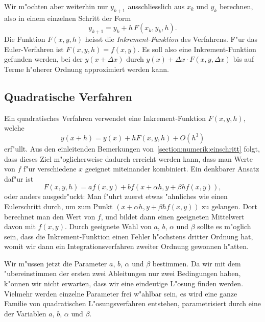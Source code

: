 Wir m"ochten aber weiterhin nur $y_{k+1}$ ausschliesslich aus $x_k$ und $y_k$
berechnen, also in einem einzelnen Schritt der Form
\[
y_{k+1}=y_k + h\, F(x_k, y_k, h).
\]
Die Funktion $F(x,y,h)$ heisst die {\em Inkrement-Funktion}
des Verfahrens.
F"ur das Euler-Verfahren ist $F(x,y,h)=f(x,y)$.
Es soll also eine Inkrement-Funktion gefunden werden, bei der $y(x+\Delta x)$
durch $y(x) + \Delta x\cdot F(x,y,\Delta x)$ bis auf Terme h"oherer
Ordnung approximiert werden kann.

\subsection{Quadratische Verfahren}
Ein quadratisches Verfahren verwendet eine Inkrement-Funktion $F(x,y,h)$,
welche
\[
y(x+h)=y(x)+hF(x,y,h)+O(h^3)
\]
erf"ullt.
Aus den einleitenden Bemerkungen von~\ref{section:numerik:einschritt}
folgt, dass dieses Ziel m"oglicherweise dadurch erreicht werden kann,
dass man Werte von $f$ f"ur verschiedene $x$ geeignet miteinander
kombiniert.
Ein denkbarer Ansatz daf"ur ist
\[
F(x,y,h)=af(x,y) + bf(x+\alpha h, y +\beta hf(x,y)),
\]
oder anders ausgedr"uckt: Man f"uhrt zuerst etwas "ahnliches wie einen
Eulerschritt durch, um zum Punkt $(x+\alpha h,y+\beta hf(x,y))$ zu
gelangen.
Dort berechnet man den Wert von $f$, und bildet dann einen geeigneten
Mittelwert davon  mit $f(x,y)$.
Durch geeignete Wahl von $a$, $b$, $\alpha$ und $\beta$ sollte es m"oglich
sein, dass die Inkrement-Funktion einen Fehler h"ochstens dritter Ordnung
hat, womit wir dann ein Integrationsverfahren zweiter Ordnung gewonnen
h"atten.

Wir m"ussen jetzt die Parameter $a$, $b$, $\alpha$ und $\beta$ bestimmen.
Da wir mit dem "ubereinstimmen der ersten zwei Ableitungen
nur zwei Bedingungen haben, k"onnen wir nicht erwarten, dass wir
eine eindeutige L"osung finden werden.
Vielmehr werden einzelne Parameter frei w"ahlbar sein, es wird eine
ganze Familie von quadratischen L"osungsverfahren entstehen, parametrisiert
durch eine der Variablen $a$, $b$, $\alpha$ und $\beta$.

